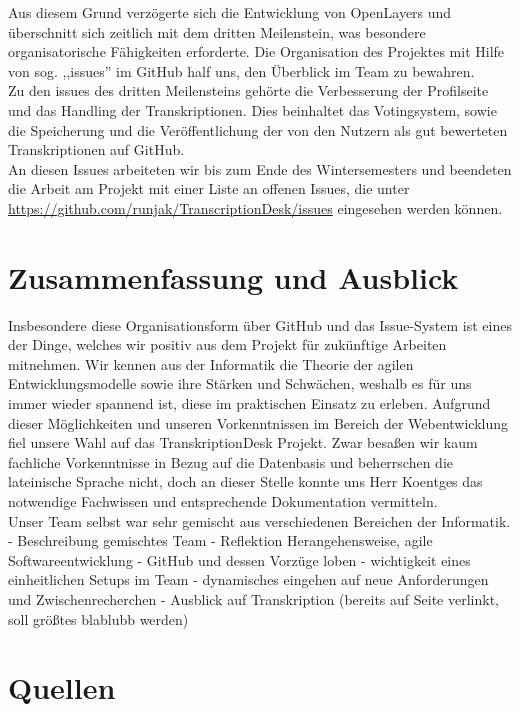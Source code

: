 \documentclass{article}
\begin{document}
Aus diesem Grund verzögerte sich die Entwicklung von OpenLayers und überschnitt sich zeitlich mit dem dritten Meilenstein, 
was besondere organisatorische Fähigkeiten erforderte.
Die Organisation des Projektes mit Hilfe von sog. ,,issues'' im GitHub half uns, den Überblick im Team zu bewahren.\\
Zu den issues des dritten Meilensteins gehörte die Verbesserung der Profilseite und das Handling der Transkriptionen.
Dies beinhaltet das Votingsystem, sowie die Speicherung und die Veröffentlichung der von den Nutzern als gut bewerteten Transkriptionen auf GitHub.\\
An diesen Issues arbeiteten wir bis zum Ende des Wintersemesters und beendeten die Arbeit am Projekt mit einer Liste an offenen Issues,
die unter \url{https://github.com/runjak/TranscriptionDesk/issues} eingesehen werden können.

\section{Zusammenfassung und Ausblick}
Insbesondere diese Organisationsform über GitHub und das Issue-System ist eines der Dinge, welches wir positiv aus dem Projekt für zukünftige Arbeiten mitnehmen.
Wir kennen aus der Informatik die Theorie der agilen Entwicklungsmodelle sowie ihre Stärken und Schwächen, weshalb es für uns immer wieder spannend ist, diese im praktischen Einsatz zu erleben.
Aufgrund dieser Möglichkeiten und unseren Vorkenntnissen im Bereich der Webentwicklung fiel unsere Wahl auf das TranskriptionDesk Projekt.
Zwar besaßen wir kaum fachliche Vorkenntnisse in Bezug auf die Datenbasis und beherrschen die lateinische Sprache nicht, doch an dieser Stelle konnte uns Herr Koentges das notwendige Fachwissen und entsprechende Dokumentation vermitteln.\\
Unser Team selbst war sehr gemischt aus verschiedenen Bereichen der Informatik.
- Beschreibung gemischtes Team
- Reflektion Herangehensweise, agile Softwareentwicklung
- GitHub und dessen Vorzüge loben
- wichtigkeit eines einheitlichen Setups im Team
- dynamisches eingehen auf neue Anforderungen und Zwischenrecherchen
- Ausblick auf Transkription (bereits auf Seite verlinkt, soll größtes blablubb werden)


\section*{Quellen}
  \printbibliography[%
    heading=bibintoc, %
  ]
\end{document}
